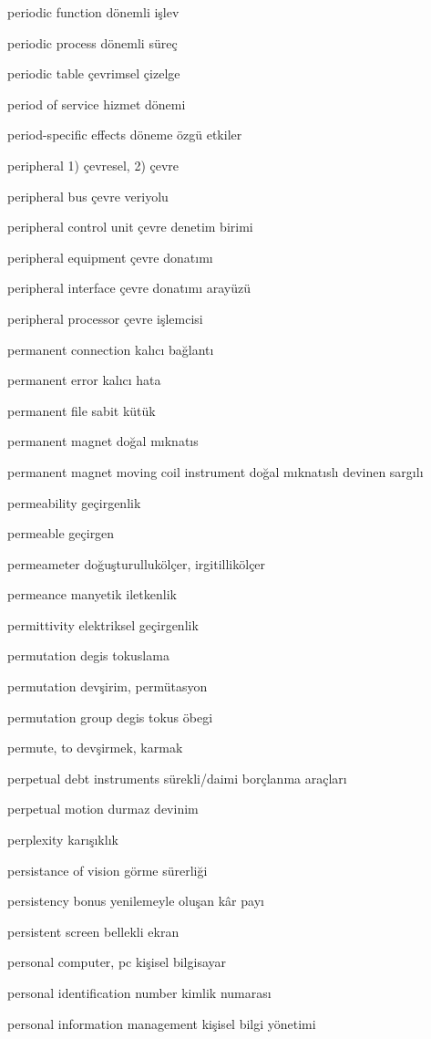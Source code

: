 \documentclass[12pt,fleqn]{article}\usepackage{../../common}
\begin{document}
periodic function dönemli işlev

periodic process dönemli süreç

periodic table çevrimsel çizelge

period of service hizmet dönemi

period-specific effects döneme özgü etkiler

peripheral 1) çevresel, 2) çevre

peripheral bus çevre veriyolu

peripheral control unit çevre denetim birimi

peripheral equipment çevre donatımı

peripheral interface çevre donatımı arayüzü

peripheral processor çevre işlemcisi

permanent connection kalıcı bağlantı

permanent error kalıcı hata

permanent file sabit kütük

permanent magnet doğal mıknatıs

permanent magnet moving coil instrument doğal mıknatıslı devinen sargılı

permeability geçirgenlik

permeable geçirgen

permeameter doğuşturullukölçer, irgitillikölçer

permeance manyetik iletkenlik

permittivity elektriksel geçirgenlik

permutation degis tokuslama

permutation devşirim, permütasyon

permutation group degis tokus öbegi

permute, to devşirmek, karmak

perpetual debt instruments sürekli/daimi borçlanma araçları

perpetual motion durmaz devinim

perplexity karışıklık

persistance of vision görme sürerliği

persistency bonus yenilemeyle oluşan kâr payı

persistent screen bellekli ekran

personal computer, pc kişisel bilgisayar

personal identification number kimlik numarası

personal information management kişisel bilgi yönetimi
\end{document}
